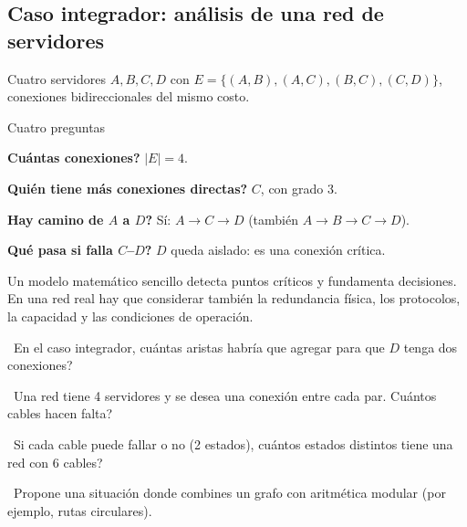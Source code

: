 \subsection{Caso integrador: an\'alisis de una red de servidores}
Cuatro servidores $A, B, C, D$ con $E=\{(A, B),(A, C),(B, C),(C, D)\}$, conexiones bidireccionales del mismo costo.

\begin{tmejemplo}{Cuatro preguntas}
\begin{tmpasos}
\item \textbf{\textquestiondown Cu\'antas conexiones?} $|E|=4$.
\item \textbf{\textquestiondown Qui\'en tiene m\'as conexiones directas?} $C$, con grado 3.
\item \textbf{\textquestiondown Hay camino de $A$ a $D$?} S\'i: $A\to C\to D$ (tambi\'en $A\to B\to C\to D$).
\item \textbf{\textquestiondown Qu\'e pasa si falla $C$--$D$?} $D$ queda aislado: es una conexi\'on cr\'itica.
\end{tmpasos}
\end{tmejemplo}

\begin{tmsistemas}
Un modelo matem\'atico sencillo detecta puntos cr\'iticos y fundamenta decisiones. En una red real hay que considerar tambi\'en la redundancia f\'isica, los protocolos, la capacidad y las condiciones de operaci\'on.
\end{tmsistemas}

\begin{tmejercicios}
\label{ej:2-7}
\begin{tmlista}
\item \tmbasico\ En el caso integrador, \textquestiondown cu\'antas aristas habr\'ia que agregar para que $D$ tenga dos conexiones?
\item \tmmedio\ Una red tiene 4 servidores y se desea una conexi\'on entre cada par. \textquestiondown Cu\'antos cables hacen falta?
\item \tmmedio\ Si cada cable puede fallar o no (2 estados), \textquestiondown cu\'antos estados distintos tiene una red con 6 cables?
\item \tmdificil\ Propone una situaci\'on donde combines un grafo con aritm\'etica modular (por ejemplo, rutas circulares).
\end{tmlista}
\end{tmejercicios}

